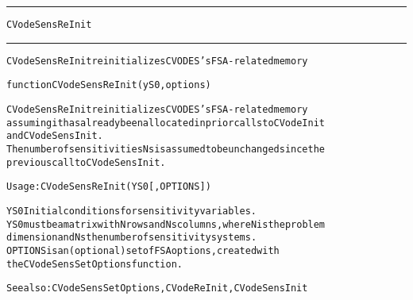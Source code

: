 \begin{samepage}
\hrule
\begin{center}
{\large \verb!CVodeSensReInit!}
\label{p:CVodeSensReInit}
\end{center}
\hrule\vspace{0.1in}



\begin{alltt}
CVodeSensReInit reinitializes CVODES's FSA-related memory
\end{alltt}

\end{samepage}



\begin{samepage}


\begin{alltt}
function CVodeSensReInit(yS0, options) 
\end{alltt}

\end{samepage}



\begin{alltt}
CVodeSensReInit reinitializes CVODES's FSA-related memory
   assuming it has already been allocated in prior calls to CVodeInit 
   and CVodeSensInit.
   The number of sensitivities Ns is assumed to be unchanged since the 
   previous call to CVodeSensInit.

   Usage: CVodeSensReInit ( YS0 [, OPTIONS ] ) 

   YS0      Initial conditions for sensitivity variables.
            YS0 must be a matrix with N rows and Ns columns, where N is the problem
            dimension and Ns the number of sensitivity systems.
   OPTIONS  is an (optional) set of FSA options, created with
            the CVodeSensSetOptions function. 

   See also: CVodeSensSetOptions, CVodeReInit, CVodeSensInit
\end{alltt}






\vspace{0.1in}